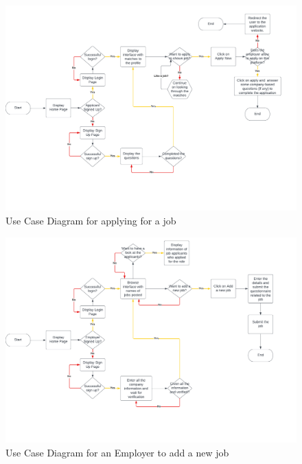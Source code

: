 \begin{figure}
    \noindent
    \centering
    \includegraphics[width = 140mm]{Figures/applying.pdf}
    \decoRule
    \caption[Use Case Diagram for applying for a job]{Use Case Diagram for applying for a job}
    \label{fig: Use Case Diagram for applying for a job}
\end{figure}

\begin{figure}
    \noindent
    \centering
    \includegraphics[width = 140mm]{Figures/employer.pdf}
    \decoRule
    \caption[Use Case Diagram for an Employer to add a new job]{Use Case Diagram for an Employer to add a new job}
    \label{fig: Use Case Diagram for an Employer to add a new job}
\end{figure}

\newpage
